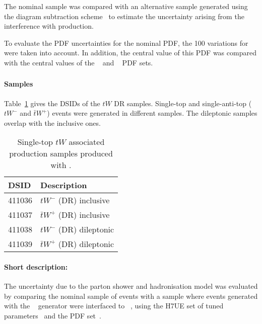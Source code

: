 

The nominal \POWPY[8] sample was compared with an alternative
sample generated using the diagram subtraction
scheme~\cite{Frixione:2008yi,ATL-PHYS-PUB-2016-020} to estimate the
uncertainty arising from the interference with \ttbar production.

To evaluate the PDF uncertainties for the nominal PDF, the 100
variations for \NNPDF[3.0nlo] were taken into account. 
In addition, the central value of this PDF was compared with the 
central values of the \CT[14nnlo]~\cite{Dulat:2015mca} and
\MMHT[nnlo]~\cite{Harland-Lang:2014zoa} PDF sets.

\subsubsection[Powheg+Herwig7]{\POWHER[7]}
\label{subsubsec:tW_PH7}

\paragraph{Samples}

Table~\ref{tab:tW_PH7} gives the DSIDs of the $tW$ \POWHER[7] DR samples.
Single-top and single-anti-top ($tW^-$ and $\bar{t}W^+$) events were generated in different samples.
The dileptonic samples overlap with the inclusive ones.
\begin{table}[htbp]
\begin{center}
\caption{Single-top $tW$ associated production samples produced with \POWHER[7].} 
\label{tab:tW_PH7}
\begin{tabular}{ l | l }
\hline
DSID & Description \\
\hline
411036 & $tW^-$ (DR) inclusive \\
411037 & $\bar{t}W^+$ (DR) inclusive \\
411038 & $tW^-$ (DR) dileptonic \\
411039 & $\bar{t}W^+$ (DR) dileptonic \\
\hline
\end{tabular}
\end{center}
\end{table}

\paragraph{Short description:}

The uncertainty due to the parton shower and hadronisation model was
evaluated by comparing the nominal sample of events with a sample where
events generated with the
\POWHEGBOX[v2]~\cite{Re:2010bp,Nason:2004rx,Frixione:2007vw,Alioli:2010xd}
generator were interfaced to
\HERWIG[7.04]~\cite{Bahr:2008pv,Bellm:2015jjp}, using the H7UE set
of tuned parameters~\cite{Bellm:2015jjp} and the \MMHT[lo] PDF set~\cite{Harland-Lang:2014zoa}.

